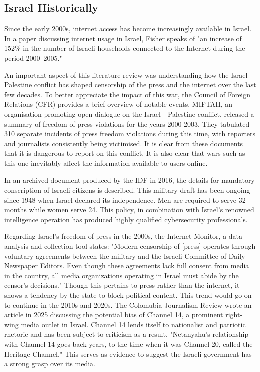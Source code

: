 \subsection{Israel Historically}
Since the early 2000s, internet access has become increasingly available in Israel. In a paper discussing internet usage in Israel, Fisher speaks of "an increase of 152\% in the number of Israeli households connected to the Internet during the period 2000–2005." \cite{FISHER2006984} 

An important aspect of this literature review was understanding how the Israel - Palestine conflict has shaped censorship of the press and the internet over the last few decades. To better appreciate the impact of this war, the Council of Foreign Relations (CFR) provides a brief overview of notable events. \cite{CFR2024Timeline} MIFTAH, an organisation promoting open dialogue on the Israel - Palestine conflict, released a summary of freedom of press violations for the years 2000-2003. They tabulated 310 separate incidents of press freedom violations during this time, with reporters and journalists consistently being victimised. \cite{Miftah2003Censorship} It is clear from these documents that it is dangerous to report on this conflict. It is also clear that wars such as this one inevitably affect the information available to users online.

In an archived document produced by the IDF in 2016, the details for mandatory conscription of Israeli citizens is described. \cite{MOIA2016IDF} This military draft has been ongoing since 1948 when Israel declared its independence. Men are required to serve 32 months while women serve 24. This policy, in combination with Israel's renowned intelligence operation has produced highly qualified cybersecurity professionals. 

Regarding Israel's freedom of press in the 2000s, the Internet Monitor, a data analysis and collection tool states: "Modern censorship of [press] operates through voluntary agreements between the military and the Israeli Committee of Daily Newspaper Editors. Even though these agreements lack full consent from media in the country, all media organizations operating in Israel must abide by the censor's decisions." \cite{internet_monitor_israel} Though this pertains to press rather than the internet, it shows a tendency by the state to block political content. This trend would go on to continue in the 2010s and 2020s. The Colomubia Journalism Review wrote an article in 2025 discussing the potential bias of Channel 14, a prominent right-wing media outlet in Israel. Channel 14 lends itself to nationalist and patriotic rhetoric and has been subject to criticism as a result. "Netanyahu’s relationship with Channel 14 goes back years, to the time when it was Channel 20, called the Heritage Channel." \cite{CJR2024IsraelChannel14} This serves as evidence to suggest the Israeli government has a strong grasp over its media. 

